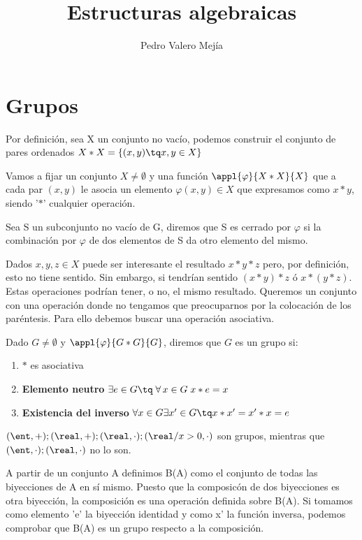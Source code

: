 \documentclass[a4paper,10pt]{apuntes}
\title{Estructuras algebraicas}
\author{Pedro Valero Mejía}
\begin{document}
\maketitle

\section{Grupos}
 
 Por definición, sea X un conjunto no vacío, podemos construir el conjunto de pares ordenados $X\ast X=\{(x,y)\tq x,y\in X\}$
 
 Vamos a fijar un conjunto $X\neq \emptyset$  y una función $\appl{\varphi}{X\ast X}{X}$ que a cada par $(x,y)$ le 
 asocia un elemento $\varphi(x,y) \in X$ que expresamos como $x\ast y$, siendo '$\ast$' cualquier operación.
 
 \begin{defn}
  Sea S un subconjunto no vacío de G, diremos que S es cerrado por $\varphi$  si la combinación por $\varphi$  de dos elementos de
  S da otro elemento del mismo.
 \end{defn}
 
 Dados $x,y,z \in X$ puede ser interesante el resultado $x\ast y\ast z$ pero, por definición, esto no tiene sentido. Sin embargo, si tendrían 
 sentido $(x\ast y)\ast z$ ó $x\ast (y\ast z)$. Estas operaciones podrían tener, o no, el mismo resultado. Queremos un conjunto con una operación 
 donde no tengamos que preocuparnos por la colocación de los paréntesis. Para ello debemos buscar una operación asociativa.
 
 \begin{defn}[Grupo]
 Dado $G\neq \emptyset$  y $\appl{\varphi}{G\ast G}{G}$, diremos que $G$ es un grupo si:
 \begin{enumerate}
  \item $\ast$ es asociativa
  \item \textbf{Elemento neutro} $\exists  e \in G \tq \; \forall\, x\in G\; x\ast e=x$
  \item \textbf{Existencia del inverso} $\forall x \in G \exists x' \in G \tq x\ast x'=x'\ast x=e$
 \end{enumerate}
\end{defn}


 \begin{example}
   $ (\ent, +); (\real, +); (\real, \cdot); (\real/x>0, \cdot)$ son grupos, mientras que 
   $(\ent, \cdot); (\real, \cdot)$ no lo son.
   
   A partir de un conjunto A definimos B(A) como el conjunto de todas las biyecciones de A en sí mismo. Puesto que la composicón 
   de dos biyecciones es otra biyección, la composición es una operación definida sobre B(A). Si tomamos como elemento 'e' la biyección 
   identidad y como x' la función inversa, podemos comprobar que B(A) es un grupo respecto a la composición.
 \end{example}
  
\end{document}

